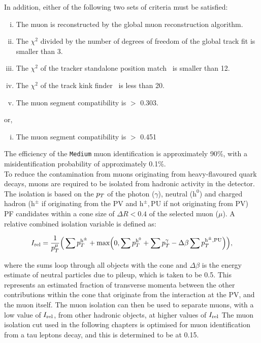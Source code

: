 In addition, either of the following two sets of criteria must be satisfied:

\begin{enumerate}[i)]
\item The muon is reconstructed by the global muon reconstruction algorithm.
\item The $\chi^2$ divided by the number of degrees of freedom of the global track fit is smaller than 3.
\item The $\chi^2$ of the tracker standalone position match~\cite{CMS:2009fdy} is smaller than 12.
\item The $\chi^2$ of the track kink finder~\cite{CMS:2018rym} is less than 20.
\item The muon segment compatibility is $>$ 0.303.
\end{enumerate}

or,

\begin{enumerate}[i)]
\item The muon segment compatibility is $>$ 0.451 
\end{enumerate}

The efficiency of the \texttt{Medium} muon identification is approximately 90\%, with a misidentification probability of approximately 0.1\%. \\

To reduce the contamination from muons originating from heavy-flavoured quark decays, muons are required to be isolated from hadronic activity in the detector. 
The isolation is based on the $p_{T}$ of the photon ($\gamma$), neutral ($\text{h}^0$) and charged hadron ($\text{h}^{\pm}$ if originating from the \ac{PV} and $\text{h}^{\pm}, \text{PU}$ if not originating from \ac{PV}) \ac{PF} candidates within a cone size of $\Delta R<0.4$ of the selected muon ($\mu$). 
A relative combined isolation variable is defined as:

\begin{equation}
\label{eqn:reliso}
I_{\text{rel}} = \frac{1}{p_{T}^{\mu}} \Big( \sum p_{T}^{\text{h}^{\pm}} + \text{max}\Big( 0, \sum p_{T}^{\text{h}^0} + \sum p_{T}^{\gamma} - \Delta \beta \sum p_{T}^{\text{h}^{\pm}, \text{PU}} \Big) \Big),
\end{equation}

where the sums loop through all objects with the cone and $\Delta \beta$ is the energy estimate of neutral particles due to pileup, which is taken to be 0.5.
This represents an estimated fraction of transverse momenta between the other contributions within the cone that originate from the interaction at the \ac{PV}, and the muon itself.
The muon isolation can then be used to separate muons, with a low value of $I_{\text{rel}}$, from other hadronic objects, at higher values of $I_{\text{rel}}$
The muon isolation cut used in the following chapters is optimised for muon identification from a tau leptons decay, and this is determined to be at 0.15.

